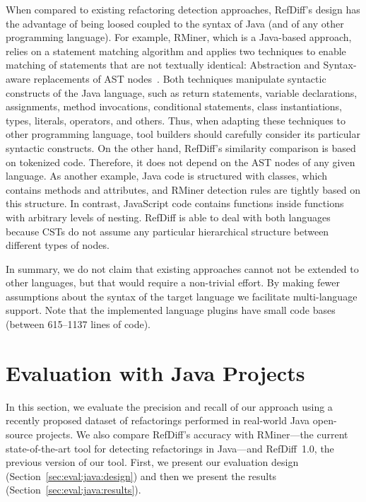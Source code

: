 When compared to existing refactoring detection approaches, RefDiff's design has the advantage of being loosed coupled to the syntax of Java (and of any other programming language).
For example, RMiner, which is a Java-based approach, relies on a statement matching algorithm and applies two techniques to enable matching of statements that are not textually identical: Abstraction and Syntax-aware replacements of AST nodes~\citep{tsantalis2018rminer}.
Both techniques manipulate syntactic constructs of the Java language,
such as return statements, variable declarations, assignments, method invocations, conditional statements, class instantiations, types, literals, operators, and others. Thus, when adapting these techniques to other programming language, tool builders should carefully consider its particular syntactic constructs. On the other hand, RefDiff's similarity comparison is based on tokenized code. Therefore, it does not depend on the AST nodes of any given language. 
As another example, Java code is structured with classes, which contains methods and attributes, and RMiner detection rules are tightly based on this structure. In contrast, JavaScript code contains functions inside functions with arbitrary levels of nesting. RefDiff is able to deal with both languages because CSTs do not assume any particular hierarchical structure between different types of nodes.

In summary, we do not claim that existing approaches cannot not be extended to other languages, but that would require a non-trivial effort.
By making fewer assumptions about the syntax of the target language we facilitate multi-language support. Note that the implemented language plugins have small code bases (between 615--1137 lines of code).











\section{Evaluation with Java Projects}
\label{sec:eval:java}

In this section, we evaluate the precision and recall of our approach using a recently proposed dataset of refactorings performed in real-world Java open-source projects. We also compare RefDiff's accuracy with RMiner---the current state-of-the-art tool for detecting refactorings in Java---and RefDiff~1.0, the previous version of our tool.
First, we present our evaluation design (Section~\ref{sec:eval:java:design}) and then we present the results (Section~\ref{sec:eval:java:results}).

